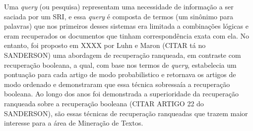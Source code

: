 Uma \textit{query} (ou pesquisa) representam uma necessidade de informação a ser saciada por um SRI, e essa \textit{query} é composta de termos (um sinônimo para palavras) que nos primeiros desses sistemas era limitada a combinações lógicas e eram recuperados os documentos que tinham correspondência exata com ela. 
No entanto, foi proposto em XXXX por Luhn e Maron (CITAR tá no SANDERSON) uma abordagem de recuperação ranqueada, em contraste com recuperação booleana, a qual, com base nos termos de \textit{query}, estabelecia um pontuação para cada artigo de modo probabilistico e retornava os artigos de modo ordenado e demonstraram que essa técnica sobressaía a recuperação booleana. 
Ao longo dos anos foi demonstrada a superioridade da recuperação ranqueada sobre a recuperação booleana (CITAR ARTIGO 22 do SANDERSON), são essas técnicas de recuperação ranqueadas que trazem maior interesse para a área de Mineração de Textos.



